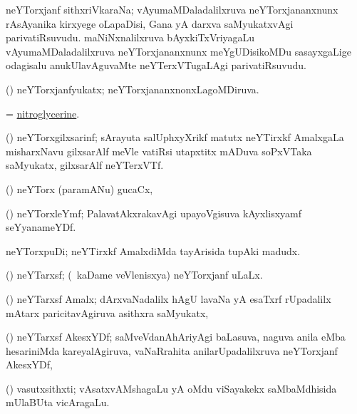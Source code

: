 \bentry
{}
\gl{\nA}
\bmng
neYTorxjanf sithxriVkaraNa; 
\banum
{} vAyumaMDaladalilxruva neYTorxjananxnunx rAsAyanika kirxyege oLapaDisi, Gana yA darxva saMyukatxvAgi parivatiRsuvudu. 
 maNiNxnalilxruva bAyxkiTxVriyagaLu vAyumaMDaladalilxruva neYTorxjananxnunx meYgUDisikoMDu sasayxgaLige odagisalu anukUlavAguvaMte neYTerxVTugaLAgi parivatiRsuvudu. 
\eanum
\emng
\eentry

\bentry
{}
\gl{\gu}
\bmng
(\ravi) neYTorxjanfyukatx; neYTorxjananxnonxLagoMDiruva. 
\emng
\eentry

\bentry
{}
\gl{\nA}
\bmng
= \hyperlink{nitroglycerine}{nitroglycerine}. 
\emng
\eentry

\bentry
{}
\gl{\nA}
\bmng
(\ravi) neYTorxgilxsarinf; sArayuta salUphxyXrikf matutx neYTirxkf AmalxgaLa misharxNavu gilxsarAlf meVle vatiRsi utapxtitx mADuva soPxVTaka saMyukatx, gilxsarAlf neYTerxVTf. 
\emng
\eentry

\bentry
{}
\gl{\nA}
\bmng
(\ravi) neYTorx (paramANu) gucaCx,  
\emng
\eentry

\bentry
{}
\gl{\nA}
\bmng
(\ravi) neYTorxleYmf; PalavatAkxrakavAgi upayoVgisuva kAyxlisxyamf seYyanameYDf. 
\emng
\eentry

\bentry
{}
\gl{\nA}
\bmng
neYTorxpuDi; neYTirxkf AmalxdiMda tayArisida tupAki madudx. 
\emng
\eentry

\bentry
{}
\gl{\gu}
\bmng
(\ravi) neYTarxsf; (\kanmu\ kaDame veVlenisxya) neYTorxjanf uLaLx. 
\emng
\eentry

\bentry
{}
\gl{\nA}
\bmng
(\ravi) neYTarxsf Amalx; dArxvaNadalilx hAgU lavaNa yA esaTxrf rUpadalilx mAtarx paricitavAgiruva asithxra saMyukatx,  
\emng
\eentry

\bentry
{}
\gl{\nA}
\bmng
(\ravi) neYTarxsf AkesxYDf; saMveVdanAhAriyAgi baLasuva, naguva anila eMba hesariniMda kareyalAgiruva, vaNaRrahita anilarUpadalilxruva neYTorxjanf AkesxYDf,  
\emng
\eentry

\bentry
{}
\gl{\nA}
\bmng
(\ashi) vasutxsithxti; vAsatxvAMshagaLu yA oMdu viSayakekx saMbaMdhisida mUlaBUta vicAragaLu. 
\emng
\eentry

